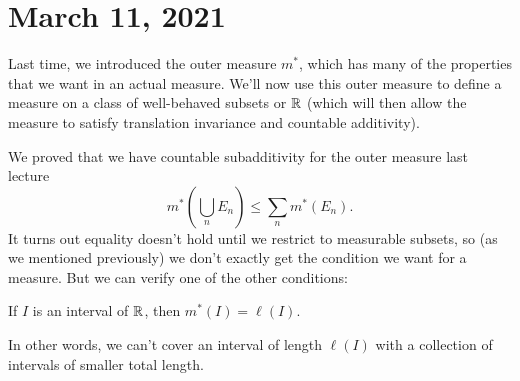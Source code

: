 \pagebreak\section{March 11, 2021}

Last time, we introduced the outer measure $m^\ast$, which has many of the properties that we want in an actual measure. We'll now use this outer measure to define a measure on a class of well-behaved subsets or $\mathbb R$ (which will then allow the measure to satisfy translation invariance and countable additivity). 

We proved that we have countable subadditivity for the outer measure last lecture
\[
    m^\ast \left(\bigcup_{n} E_n \right) \le \sum_n m^\ast(E_n).
\]
It turns out equality doesn't hold until we restrict to measurable subsets, so (as we mentioned previously) we don't exactly get the condition we want for a measure. But we can verify one of the other conditions:

\begin{proposition}
If $I$ is an interval of $\mathbb R$, then $m^\ast(I) = \ell(I)$.
\end{proposition}

In other words, we can't cover an interval of length $\ell(I)$ with a collection of intervals of smaller total length.

